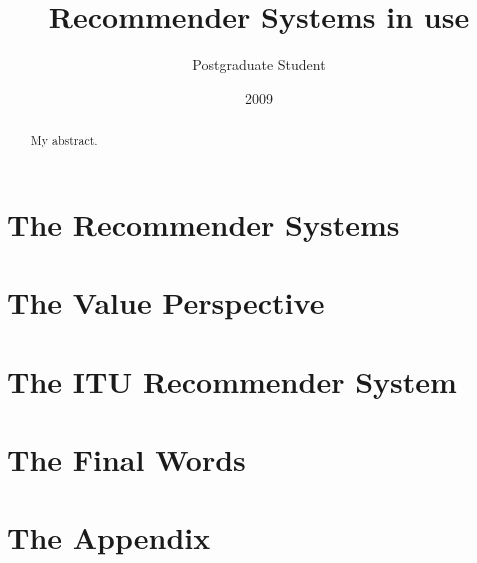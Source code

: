 \documentclass[10pt, oneside]{report}
\title{Recommender Systems in use}
\author{Postgraduate Student}
\date{2009}
\begin{document}
\newcommand\todo[1]{\textcolor{red}{#1}\PackageWarning{TODO:}{#1!}}

\maketitle


\begin{abstract}
My abstract.
\end{abstract}

\tableofcontents

\chapter{The Recommender Systems}
\label{chap:chapter1}





\chapter{The Value Perspective}
\label{chap:chapter2}

\chapter{The ITU Recommender System}
\label{chap:chapter3}




%

\chapter{The Final Words}
\label{cha:the_final_words}



\chapter{The Appendix}

\end{document}
